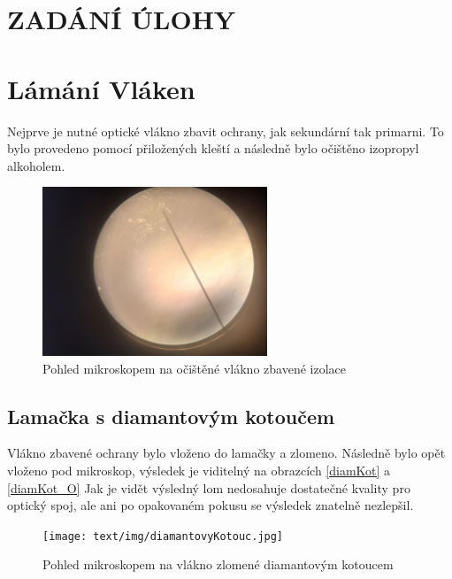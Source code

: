 \documentclass{protokol}
\begin{document}
	\maketitle

\section*{ZADÁNÍ ÚLOHY}
  
\setcounter{section}{0}

\newpage
\section{Lámání Vláken}
  Nejprve je nutné optické vlákno zbavit ochrany, jak sekundární tak primarni.
  To bylo provedeno pomocí přiložených kleští a následně bylo očištěno izopropyl alkoholem.
  
  \begin{figure}[h!]
    \centering
    \includegraphics[width=0.6\textwidth]{text/img/odizolovano.jpg}
    \caption{\label{fig:odizolovano} Pohled mikroskopem na očištěné vlákno zbavené izolace}
  \end{figure}
  
  \subsection{Lamačka s diamantovým kotoučem}
    Vlákno zbavené ochrany bylo vloženo do lamačky a zlomeno.
    Následně bylo opět vloženo pod mikroskop, výsledek je viditelný na obrazcích \ref{diamKot} a \ref{diamKot_O}
    Jak je vidět výsledný lom nedosahuje dostatečné kvality pro optický spoj, ale ani po opakovaném pokusu se výsledek znatelně nezlepšil.  

    \begin{figure}[h!]
      \centering
      \texttt{[image: text/img/diamantovyKotouc.jpg]} 
      \caption{\label{fig:diamKot} Pohled mikroskopem na vlákno zlomené diamantovým kotoucem}
    \end{figure}
\end{document}
